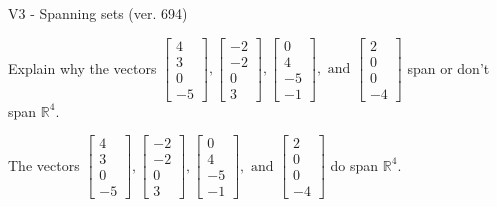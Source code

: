 \begin{exercise}
  \begin{exerciseTitle}V3 - Spanning sets (ver. 694)\end{exerciseTitle}
  \begin{exerciseStatement}
    Explain why the vectors \(\left[\begin{array}{r}
4 \\
3 \\
0 \\
-5
\end{array}\right] , \left[\begin{array}{r}
-2 \\
-2 \\
0 \\
3
\end{array}\right] , \left[\begin{array}{r}
0 \\
4 \\
-5 \\
-1
\end{array}\right] , \text{ and } \left[\begin{array}{r}
2 \\
0 \\
0 \\
-4
\end{array}\right]\) span or don't span \(\mathbb{R}^4\). 
	


  \end{exerciseStatement}
  \begin{exerciseAnswer}
   The vectors \(\left[\begin{array}{r}
4 \\
3 \\
0 \\
-5
\end{array}\right] , \left[\begin{array}{r}
-2 \\
-2 \\
0 \\
3
\end{array}\right] , \left[\begin{array}{r}
0 \\
4 \\
-5 \\
-1
\end{array}\right] , \text{ and } \left[\begin{array}{r}
2 \\
0 \\
0 \\
-4
\end{array}\right]\) 
  	 do  
	span \(\mathbb{R}^4\).
  


  \end{exerciseAnswer}
\end{exercise}
